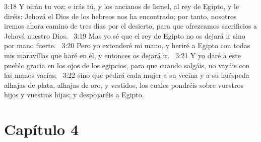 3:18 Y oirán tu voz; e irás tú, y los ancianos de Israel, al rey de Egipto, y le diréis: Jehová el Dios de los hebreos nos ha encontrado; por tanto, nosotros iremos ahora camino de tres días por el desierto, para que ofrezcamos sacrificios a Jehová nuestro Dios.  
3:19 Mas yo sé que el rey de Egipto no os dejará ir sino por mano fuerte.  
3:20 Pero yo extenderé mi mano, y heriré a Egipto con todas mis maravillas que haré en él, y entonces os dejará ir.  
3:21 Y yo daré a este pueblo gracia en los ojos de los egipcios, para que cuando salgáis, no vayáis con las manos vacías;  
3:22 sino que pedirá cada mujer a su vecina y a su huéspeda alhajas de plata, alhajas de oro, y vestidos, los cuales pondréis sobre vuestros hijos y vuestras hijas; y despojaréis a Egipto. 
\section*{Capítulo 4 }

